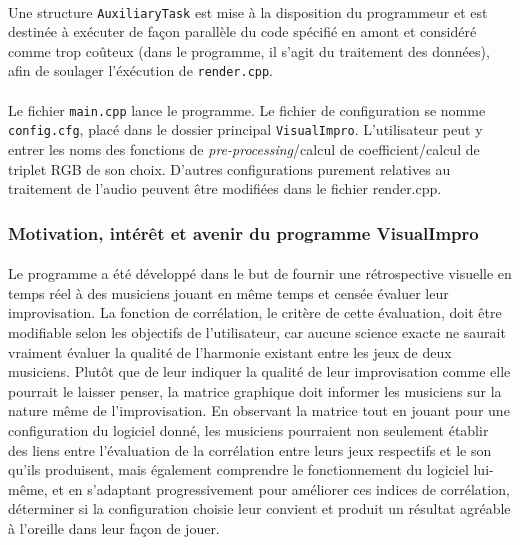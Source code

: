 \paragraph{}
Une structure \verb!AuxiliaryTask! est mise à la disposition du
programmeur et est destinée à exécuter de façon parallèle du code spécifié
en amont et considéré comme trop coûteux (dans le programme, il s'agit du
traitement des données), afin de soulager l'éxécution de \verb!render.cpp!.


\paragraph{}
Le fichier \verb!main.cpp! lance le programme. Le fichier de
configuration se nomme \\\verb!config.cfg!, placé dans le dossier
principal \verb!VisualImpro!.  L'utilisateur peut y entrer les noms
des fonctions de \textit{pre-processing}/calcul de coefficient/calcul
de triplet RGB de son choix. D'autres configurations purement
relatives au traitement de l'audio peuvent être modifiées dans le
fichier render.cpp.

\subsubsection{Motivation, intérêt et avenir du programme VisualImpro}
\paragraph{}
Le programme a été développé dans le but de fournir une rétrospective
visuelle en temps réel à des musiciens jouant en même temps et censée
évaluer leur improvisation. La fonction de corrélation, le critère de
cette évaluation, doit être modifiable selon les objectifs de
l'utilisateur, car aucune science exacte ne saurait vraiment évaluer
la qualité de l'harmonie existant entre les jeux de deux
musiciens. Plutôt que de leur indiquer la qualité de leur
improvisation comme elle pourrait le laisser penser, la matrice
graphique doit informer les musiciens sur la nature même de
l'improvisation. En observant la matrice tout en jouant pour une
configuration du logiciel donné, les musiciens pourraient non
seulement établir des liens entre l'évaluation de la corrélation entre
leurs jeux respectifs et le son qu'ils produisent, mais également
comprendre le fonctionnement du logiciel lui-même, et en s'adaptant
progressivement pour améliorer ces indices de corrélation, déterminer
si la configuration choisie leur convient et produit un résultat
agréable à l'oreille dans leur façon de jouer.

